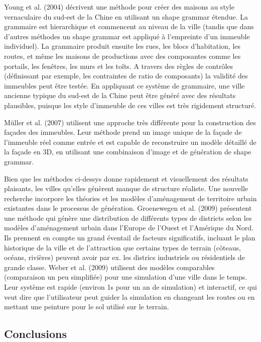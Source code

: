 \documentclass[11pt]{article}
\begin{document}
Young et al. (2004) décrivent une méthode pour créer des maisons au style vernaculaire du sud-est de la Chine en utilisant un shape grammar étendue. La grammaire est hierarchique et commencent au niveau de la ville (tandis que dans d'autres méthodes un shape grammar est appliqué à l'empreinte d'un immeuble individuel). La grammaire produit ensuite les rues, les blocs d'habitation, les routes, et même les maisons de productions avec des composantes comme les portails, les fenêtres, les murs et les toîts. A travers des règles de contrôles (définissant par exemple, les contraintes de ratio de composants) la validité des immeubles peut être testée. En appliquant ce système de grammaire, une ville ancienne typique du sud-est de la Chine peut être généré avec des résultats plausibles, puisque les style d'immeuble de ces villes est très rigidement structuré. \newline

Müller et al. (2007) utilisent une approche très différente pour la construction des façades des immeubles. Leur méthode prend un image unique de la façade de l'immeuble réel comme entrée et est capable de reconstruire un modèle détaillé de la façade en 3D, en utilisant une combinaison d'image et de génération de shape grammar. \newline

Bien que les méthodes ci-dessys donne rapidement et visuellement des résultats plaisants, les villes qu'elles génèrent manque de structure réaliste. Une nouvelle recherche incorpore les théories et les modèles d'aménagement de territoire urbain existantes dans le processus de génération. Groenewegen et al. (2009) présentent une méthode qui génère une distribution de différents types de districts selon les modèles d'aménagement urbain dans l'Europe de l'Ouest et l'Amérique du Nord. Ils prennent en compte un grand éventail de facteurs significatifs, incluant le plan historique de la ville et de l'attraction que certains types de terrain (côteaus, océans, rivières) peuvent avoir par ex. les districs industriels ou résidentiels de grande classe. Weber et al. (2009) utilisent des modèles comparables (comparaison un peu simplifiée) pour une simulation d'une ville dans le temps. Leur système est rapide (environ 1s pour un an de simulation) et interactif, ce qui veut dire que l'utilisateur peut guider la simulation en changeant les routes ou en mettant une peinture pour le sol utilisé sur le terrain.

\subsection{Conclusions}
\end{document}
